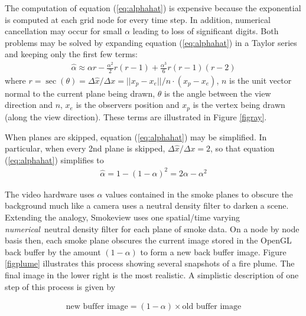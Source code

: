 \documentclass[11pt,twoside]{book}
\begin{document}
The computation of equation (\ref{eq:alphahat}) is expensive
because the exponential is computed at each grid node for every
time step.  In addition, numerical cancellation may occur for
small $\alpha$ leading to loss of significant digits. Both
problems may be solved by expanding equation (\ref{eq:alphahat})
in a Taylor series and keeping only the first few terms:
\begin{eqnarray*}
\hat{\alpha}\approx \alpha r -
\frac{\alpha^2}{2}r(r-1)+\frac{\alpha^3}{6}r(r-1)(r-2)
\end{eqnarray*}
where $r=\sec(\theta)=\Delta \hat{x}/\Delta
x=||x_p-x_e||/n\cdot(x_p-x_e)$, $n$ is the unit vector normal to
the current plane being drawn, $\theta$ is the angle between the
view direction and $n$, $x_e$ is the observers position and $x_p$
is the vertex being drawn (along the view direction).  These terms
are illustrated in Figure \ref{figray}.

When planes are skipped, equation (\ref{eq:alphahat}) may be simplified.  In particular,
when every 2nd plane is
skipped, $\Delta\hat{x}/\Delta x=2$, so that equation (\ref{eq:alphahat}) simplifies to
\begin{eqnarray*}
\hat{\alpha}=1-(1-\alpha)^2=2\alpha-\alpha^2
\end{eqnarray*}

The video hardware uses $\alpha$ values contained in the smoke planes to obscure the background much like a camera uses a neutral density filter to darken a scene.  Extending the analogy, Smokeview uses one spatial/time varying {\em numerical}\ neutral density filter for each plane of smoke data.  On a node by node basis then, each smoke plane obscures the current image stored in the OpenGL back buffer by the amount $(1-\alpha)$ to form a new back buffer image.  Figure \ref{figplume} illustrates this process showing several snapshots of a fire plume. The final image in the lower right is the most realistic.
A simplistic description of one step of this process is given by

\begin{eqnarray*}
\mbox{new buffer image} = (1-\alpha)\times \mbox{old buffer image}
\end{eqnarray*}
\end{document}
